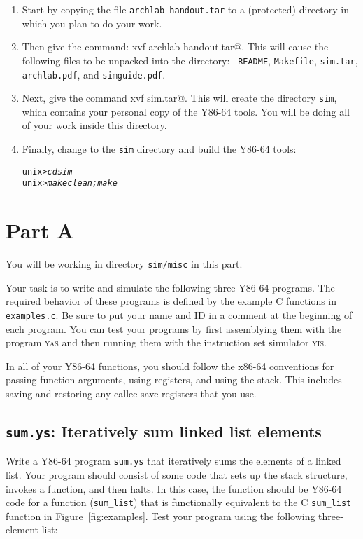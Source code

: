 \documentclass[11pt]{article}
\newenvironment{tty}%
{\small\begin{alltt}}%
{\end{alltt}}
\begin{document}
\begin{enumerate}
\item Start by copying the file {\tt archlab-handout.tar}
to a (protected) directory in which you plan to do your work.

\item Then give the command: \verb@tar xvf archlab-handout.tar@.  This will
cause the following files to be unpacked into the directory: {\tt
README}, {\tt Makefile}, {\tt sim.tar}, {\tt
archlab.pdf}, and {\tt simguide.pdf}.  

\item Next, give the command \verb@tar xvf sim.tar@. This will create the
directory {\tt sim}, which contains your personal copy of the Y86-64
tools. You will be doing all of your work inside this directory.

\item Finally, change to the {\tt sim} directory and build the
Y86-64 tools:
\begin{tty}
unix> {\em cd sim}
unix> {\em make clean; make}
\end{tty}
\end{enumerate}


\section{Part A}

You will be working in directory \texttt{sim/misc} in this part.

Your task is to write and simulate the following three Y86-64
programs.  The required behavior of these programs is defined by the
example C functions in \texttt{examples.c}. Be sure to put your name
and ID in a comment at the beginning of each program.  You can test
your programs by first assemblying them with the program \textsc{yas}
and then running them with the instruction set simulator \textsc{yis}.

In all of your Y86-64 functions, you should follow the x86-64 conventions
for passing function arguments, using registers, and using the stack.
This includes saving and restoring any callee-save registers that you use.

\subsection*{\texttt{sum.ys}: Iteratively sum linked list elements}

Write a Y86-64 program \texttt{sum.ys} that iteratively sums the
elements of a linked list. Your program should consist of some code
that sets up the stack structure, invokes a function, and then halts.
In this case, the function should be
Y86-64 code for a function (\texttt{sum\_list}) 
that is functionally equivalent to the C \texttt{sum\_list} function in
Figure~\ref{fig:examples}. Test your program using the following
three-element list:
\end{document}
